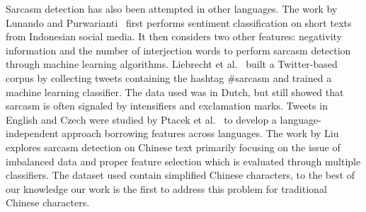 \documentclass[12pt,a4paper]{report}
\theoremstyle{definition}
\begin{document}
\begin{CJK}{UTF8}{bsmi}
\par Sarcasm detection has also been attempted in other languages.
The work by Lunando and Purwarianti~\cite{lunando2013indonesian} first
performs sentiment classification on short texts from Indonesian
social media. It then considers two other features:
negativity information and the number of interjection words to perform sarcasm detection through machine learning algorithms.
Liebrecht et al.~\cite{liebrecht2013perfect}  built a Twitter-based corpus
by collecting tweets containing the hashtag \#sarcasm and
trained a machine learning classifier. The data used was
in Dutch, but still showed that sarcasm is often signaled
by intensifiers and exclamation marks. Tweets in English
and Czech were studied by Ptacek et al.~\cite{ptacek2014sarcasm} to develop a
language-independent approach borrowing features across
languages.
The work by Liu~\cite{liu2014sarcasm} explores sarcasm detection on Chinese text primarily focusing on the issue of imbalanced data and proper feature selection which is evaluated through multiple classifiers. The dataset used contain simplified Chinese characters, to the best of our knowledge our work is the first to address this problem for traditional Chinese characters.


\end{CJK}
\end{document}
